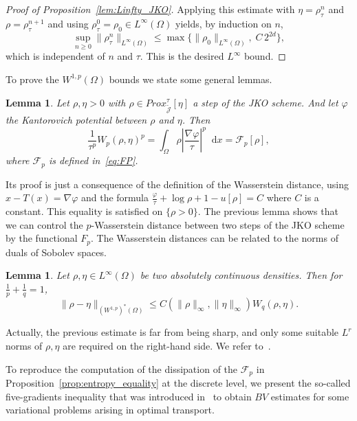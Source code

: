 \documentclass[a4paper,twosided, 11pt]{article}
\renewcommand{\color}[2][]{}
\newcommand {\f}   {\frac}
\theoremstyle{plain}
\newtheorem{lemma}[thm]{Lemma}
\theoremstyle{remark}
\newcommand{\diff}{\mathop{}\!\mathrm{d}}
\numberwithin{equation}{section}
\begin{document}
{\begin{proof}[Proof of Proposition~\ref{lem:Linfty_JKO}]
Applying this estimate with $\eta=\rho_\tau^n$ and $\rho=\rho_\tau^{n+1}$ and using
$\rho_\tau^0=\rho_0\in L^\infty(\Omega)$ yields, by induction on $n$,
\[
\sup_{n\ge 0}\|\rho_\tau^n\|_{L^\infty(\Omega)}
\le
\max\bigl\{\|\rho_0\|_{L^\infty(\Omega)},\; C\,2^{2d}\bigr\},
\]
which is independent of $n$ and $\tau$. This is the desired $L^\infty$ bound.\fi
\end{proof}

}

To prove the $W^{1,p}(\Omega)$ bounds we state some general lemmas. 

\begin{lemma}\label{lem:link_kantorovich}
Let $\rho,\eta>0$ with $\rho\in Prox_{\widetilde{\mathcal{J}}}^{\tau}[\eta]$ a step of the JKO scheme. And let $\varphi$ the Kantorovich potential between $\rho$ and $\eta$. Then
$$
\f{1}{\tau^{p}}W_{p}(\rho,\eta)^{p} = \int_{\Omega} \rho \left|\f{\nabla\varphi}{\tau}\right|^{p} \diff x = \mathcal{F}_{p}[\rho], 
$$
where $\mathcal{F}_{p}$ is defined in~\eqref{eq:FP}.
\end{lemma}

Its proof is just a consequence of the definition of the Wasserstein distance{\color{blue}, using $x-T(x)=\nabla\varphi$} and the formula $\f{\varphi}{\tau}+ \log \rho +1 -u[\rho] = C$ where $C$ is a constant. This equality is satisfied on $\{\rho>0\}$. The previous lemma shows that we can control the $p$-Wasserstein distance between two steps of the JKO scheme by the functional $F_{p}$. The Wasserstein distances can be related to the norms of duals of Sobolev spaces. 

\begin{lemma}\label{lem:sobone} Let $\rho, \eta\in L^{\infty}(\Omega)$ be two absolutely continuous densities. Then for $\f{1}{p}+\f{1}{q}=1$,
$$\| \rho- \eta\|_{(W^{1,p})^*(\Omega)} \leq C( \| \rho\|_{\infty} , \| \eta \|_{\infty}) W_q(\rho,\eta).$$
\end{lemma}

Actually, the previous estimate is far from being sharp, and only some suitable $L^{r}$ norms of $\rho,\eta$ are required on the right-hand side. We refer to~\cite[Proposition 5.9]{dimarino}. 




To reproduce the computation of the dissipation of the $\mathcal{F}_p$ in Proposition~\ref{prop:entropy_equality} at the discrete level, we present the so-called five-gradients inequality that was introduced in~\cite{de2016bv} to obtain $BV$ estimates for some variational problems arising in optimal transport. 
\end{document}
